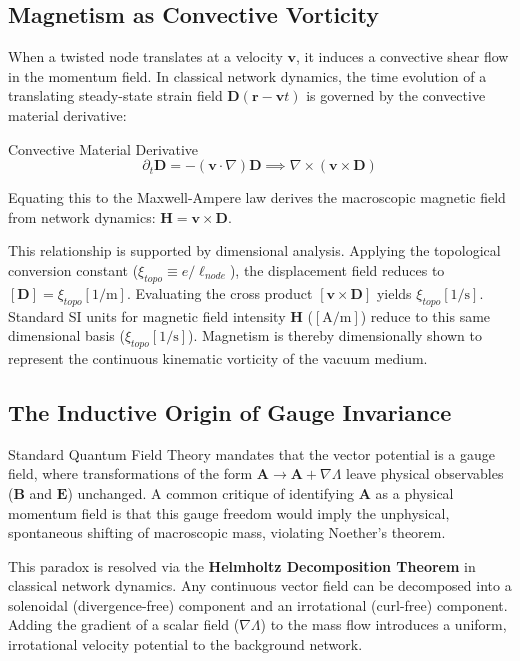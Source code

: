 \subsection{Magnetism as Convective Vorticity}
When a twisted node translates at a velocity $\mathbf{v}$, it induces a convective shear flow in the momentum field. In classical network dynamics, the time evolution of a translating steady-state strain field $\mathbf{D}(\mathbf{r} - \mathbf{v}t)$ is governed by the convective material derivative:
\begin{resultbox}{Convective Material Derivative}
\begin{equation}
    \partial_t \mathbf{D} = -(\mathbf{v} \cdot \nabla)\mathbf{D} \implies \nabla \times (\mathbf{v} \times \mathbf{D})
\end{equation}
\end{resultbox}
Equating this to the Maxwell-Ampere law derives the macroscopic magnetic field from network dynamics: $\mathbf{H} = \mathbf{v} \times \mathbf{D}$.

This relationship is supported by dimensional analysis. Applying the topological conversion constant ($\xi_{topo} \equiv e/\ell_{node}$), the displacement field reduces to $[\mathbf{D}] = \xi_{topo}[1/\text{m}]$. Evaluating the cross product $[\mathbf{v} \times \mathbf{D}]$ yields $\xi_{topo}[1/\text{s}]$. Standard SI units for magnetic field intensity $\mathbf{H}$ ($[\text{A/m}]$) reduce to this same dimensional basis ($\xi_{topo}[1/\text{s}]$). Magnetism is thereby dimensionally shown to represent the continuous kinematic vorticity of the vacuum medium.

\subsection{The Inductive Origin of Gauge Invariance}
Standard Quantum Field Theory mandates that the vector potential is a gauge field, where transformations of the form $\mathbf{A} \to \mathbf{A} + \nabla \Lambda$ leave physical observables ($\mathbf{B}$ and $\mathbf{E}$) unchanged. A common critique of identifying $\mathbf{A}$ as a physical momentum field is that this gauge freedom would imply the unphysical, spontaneous shifting of macroscopic mass, violating Noether's theorem.

This paradox is resolved via the \textbf{Helmholtz Decomposition Theorem} in classical network dynamics. Any continuous vector field can be decomposed into a solenoidal (divergence-free) component and an irrotational (curl-free) component. Adding the gradient of a scalar field ($\nabla \Lambda$) to the mass flow introduces a uniform, irrotational velocity potential to the background network.


